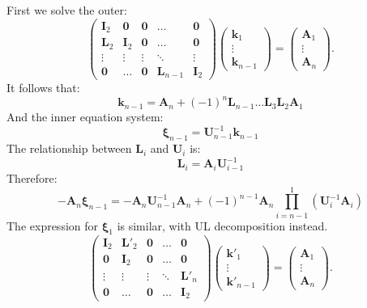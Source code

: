 \documentclass[12pt]{article}
\begin{document}
First we solve the outer:
\begin{equation}
  \begin{pmatrix}
                 \bm{I}_2 & \bm{0} & \bm{0} & \dots & \bm{0} \\
                 \bm{L}_2 & \bm{I}_2 & \bm{0} & \dots & \bm{0} \\
                 \vdots & \vdots & \vdots & \ddots & \vdots \\
                 \bm{0} & \dots & \bm{0} & \bm{L}_{n-1} & \bm{I}_{2}
               \end{pmatrix}\begin{pmatrix}
                \bm{k}_1\\ \vdots \\ \bm{k}_{n-1}
               \end{pmatrix}=\begin{pmatrix}
\bm{A}_1 \\ \vdots \\ \bm{A}_n
\end{pmatrix}.
\end{equation}
It follows that:
\begin{equation}
\bm{k}_{n-1}=\bm{A}_n+(-1)^{n}\bm{L}_{n-1}\dots\bm{L}_3\bm{L}_2\bm{A}_1
\end{equation}
And the inner equation system:
\begin{equation}
\bm{\xi}_{n-1}=\bm{U}_{n-1}^{-1}\bm{k}_{n-1}
\end{equation}
The relationship between $\bm{L}_i$ and $\bm{U}_i$ is:
\begin{equation}
\bm{L}_i=\bm{A}_i\bm{U}^{-1}_{i-1}
\end{equation}
Therefore: 
\begin{equation}
-\bm{A}_n\bm{\xi}_{n-1}=-\bm{A}_n\bm{U}^{-1}_{n-1}\bm{A}_n+(-1)^{n-1}\bm{A}_n \prod_{i=n-1}^1 (\bm{U}_i^{-1}\bm{A}_i)
\end{equation}
The expression for $\bm{\xi}_1$ is similar, with UL decomposition instead.
\begin{equation}
  \begin{pmatrix}
                 \bm{I}_2 & \bm{L'}_2 & \bm{0} & \dots & \bm{0} \\
                 \bm{0} & \bm{I}_2 & \bm{0} & \dots & \bm{0} \\
                 \vdots & \vdots & \vdots & \ddots & \bm{L'}_{n} \\
                 \bm{0} & \dots & \bm{0} & \dots & \bm{I}_{2}
               \end{pmatrix}\begin{pmatrix}
                \bm{k'}_1\\ \vdots \\ \bm{k'}_{n-1}
               \end{pmatrix}=\begin{pmatrix}
\bm{A}_1 \\ \vdots \\ \bm{A}_n
\end{pmatrix}.
\end{equation}
\end{document}
